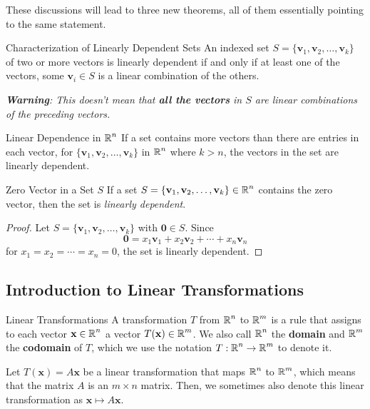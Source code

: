 \documentclass{article}
\begin{document}
These discussions will lead to three new theorems, all of them essentially pointing to the same statement.

\begin{theorem}{Characterization of Linearly Dependent Sets}
	An indexed set $S = \{\mathbf{v}_1, \mathbf{v}_2, \ldots, \mathbf{v}_k\}$ of two or more vectors is linearly dependent if and only if at least one of the vectors, some $\mathbf{v}_i \in S$ is a linear combination of the others.

	\emph{\textbf{Warning}: This doesn't mean that \textbf{all the vectors} in $S$ are linear combinations of the preceding vectors.}
\end{theorem}

\begin{theorem}{Linear Dependence in $\operatorname{\mathbb{R}}^n$}
	If a set contains more vectors than there are entries in each vector, for $\{\mathbf{v}_1, \mathbf{v}_2, \ldots, \mathbf{v}_k\}$ in $\operatorname{\mathbb{R}}^n$ where $k > n$, the vectors in the set are linearly dependent.
\end{theorem}

\begin{theorem}{Zero Vector in a Set $S$}
	If a set $S = \{\mathbf{v}_1, \mathbf{v}_2, \ldots, \mathbf{v}_k\} \in \operatorname{\mathbb{R}}^n$ contains the zero vector, then the set is \emph{linearly dependent}.
\end{theorem}
\begin{proof}{}
	Let $S = \{\mathbf{v}_1, \mathbf{v}_2, \ldots, \mathbf{v}_k\}$ with $\mathbf{0} \in S$. Since
	\begin{equation}
		\mathbf{0} = x_1\mathbf{v}_1 + x_2\mathbf{v}_2 + \cdots + x_n\mathbf{v}_n
	\end{equation}
	for $x_1 = x_2 = \cdots = x_n = 0$, the set is linearly dependent.
\end{proof}

\subsection{Introduction to Linear Transformations}

\begin{definition}{Linear Transformations}
	A transformation $T$ from $\operatorname{\mathbb{R}}^n$ to $\operatorname{\mathbb{R}}^m$ is a rule that assigns to each vector $\mathbf{x} \in \operatorname{\mathbb{R}}^n$ a vector $T(\mathbf{x}) \in \operatorname{\mathbb{R}}^m$. We also call $\operatorname{\mathbb{R}}^n$ the \textbf{domain} and $\operatorname{\mathbb{R}}^m$ the \textbf{codomain} of $T$, which we use the notation $T: \operatorname{\mathbb{R}}^n \to \operatorname{\mathbb{R}}^m$ to denote it.

	Let $T(\mathbf{x}) = A\mathbf{x}$ be a linear transformation that maps $\operatorname{\mathbb{R}}^n$ to $\operatorname{\mathbb{R}}^m$, which means that the matrix $A$ is an $m \times n$ matrix. Then, we sometimes also denote this linear transformation as $\mathbf{x} \mapsto A\mathbf{x}$.
\end{definition}
\end{document}
